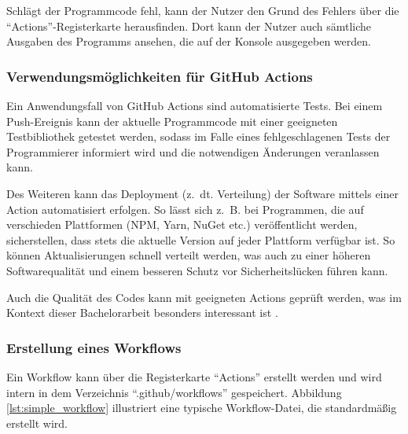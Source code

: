 Schlägt der Programmcode fehl, kann der Nutzer den Grund des Fehlers über die  \enquote{Actions}-Registerkarte herausfinden. Dort kann der Nutzer auch sämtliche Ausgaben des Programms ansehen, die auf der Konsole ausgegeben werden.

\subsubsection{Verwendungsmöglichkeiten für GitHub Actions}

Ein Anwendungsfall von GitHub Actions sind automatisierte Tests. Bei einem Push-Ereignis kann der aktuelle Programmcode mit einer geeigneten Testbibliothek getestet werden, sodass im Falle eines fehlgeschlagenen Tests der Programmierer informiert wird und die notwendigen Änderungen veranlassen kann.

Des Weiteren kann das Deployment (z.~dt. Verteilung) der Software mittels einer Action automatisiert erfolgen. So lässt sich z.~B. bei Programmen, die auf verschieden Plattformen (NPM, Yarn, NuGet etc.)  veröffentlicht werden, sicherstellen, dass stets die aktuelle Version auf jeder Plattform verfügbar ist. So können Aktualisierungen schnell verteilt werden, was auch zu einer höheren Softwarequalität und einem besseren Schutz vor Sicherheitslücken führen kann. 

Auch die Qualität des Codes kann mit geeigneten Actions geprüft werden, was im Kontext dieser Bachelorarbeit besonders interessant ist \cite[S.~1ff.]{github_action_book}.  



\subsubsection{Erstellung eines Workflows}
Ein Workflow kann über die Registerkarte \enquote{Actions} erstellt werden und wird intern in dem Verzeichnis \enquote{.github/workflows} gespeichert. Abbildung \ref{lst:simple_workflow} illustriert eine typische Workflow-Datei, die standardmäßig erstellt wird.



